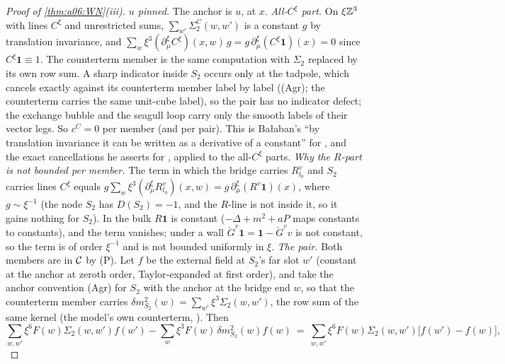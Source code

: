 \begin{proof}[Proof of \cref{thm:a06:WN}\textup{(iii)}]
\emph{$u$ pinned.} The anchor is $u$, at $x$. \emph{All-$C^\xi$ part.} On $\xi\mathbb Z^3$ with lines $C^\xi$ and unrestricted sums, $\sum_{w'}\Sigma^C_2(w,w')$ is a constant $g$ by translation invariance, and $\sum_w\xi^3(\partial^\xi_\mu C^\xi)(x,w)\,g=g\,\partial^\xi_\mu(C^\xi\mathbf 1)(x)=0$ since $C^\xi\mathbf 1\equiv1$. The counterterm member is the same computation with $\Sigma_2$ replaced by its own row sum. A sharp indicator inside $S_2$ occurs only at the \cite[(1.6)]{Ba3} tadpole, which cancels exactly against its counterterm member label by label ((Agr); the counterterm carries the same unit-cube label), so the pair has no indicator defect; the exchange bubble and the seagull loop carry only the smooth labels of their vector legs. So $c^C=0$ per member (and per pair). This is Ba{\l}aban's ``by translation invariance it can be written as a derivative of a constant'' \cite[p.~444]{Ba3} for \cite[(2.21c)]{Ba3}, and the exact cancellations he asserts for \cite[(2.21b), (2.21d), (2.21f), (2.21g)]{Ba3}, applied to the all-$C^\xi$ parts. \emph{Why the $R$-part is not bounded per member.} The term in which the bridge carries $R^v_{l_0}$ and $S_2$ carries lines $C^\xi$ equals $g\sum_w\xi^3(\partial^\xi_\mu R^v_{l_0})(x,w)=g\,\partial^\xi_\mu(R^v\mathbf 1)(x)$, where $g\sim\xi^{-1}$ (the node $S_2$ has $D(S_2)=-1$, and the $R$-line is not inside it, so it gains nothing for $S_2$). In the bulk $R\mathbf 1$ is constant ($-\Delta+m^2+aP$ maps constants to constants), and the term vanishes; under a wall $\breve G^v\mathbf 1=\mathbf 1-\breve G^v v$ is not constant, so the term is of order $\xi^{-1}$ and is not bounded uniformly in $\xi$. \emph{The pair.} Both members are in $\mathcal C$ by (P). Let $f$ be the external field at $S_2$'s far slot $w'$ (constant at the anchor at zeroth order, Taylor-expanded at first order), and take the anchor convention (Agr) for $S_2$ with the anchor at the bridge end $w$, so that the counterterm member carries $\delta m^2_{S_2}(w)=\sum_{w'}\xi^3\Sigma_2(w,w')$, the row sum of the same kernel (the model's own counterterm, \cite[p.~417]{Ba3}). Then
\[
\sum_{w,w'}\xi^6F(w)\Sigma_2(w,w')f(w')-\sum_w\xi^3F(w)\,\delta m^2_{S_2}(w)f(w)\ =\ \sum_{w,w'}\xi^6F(w)\Sigma_2(w,w')\big[f(w')-f(w)\big],
\]

\end{proof}
